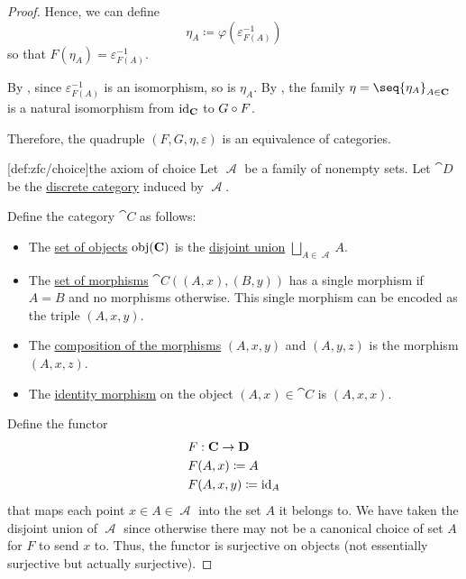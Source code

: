 \begin{proof}
  Hence, we can define
  \begin{equation*}
    \eta_A \coloneqq \varphi(\varepsilon_{F(A)}^{-1})
  \end{equation*}
  so that \( F(\eta_A) = \varepsilon_{F(A)}^{-1} \).

  By , since \( \varepsilon_{F(A)}^{-1} \) is an isomorphism, so is \( \eta_A \). By , the family \( \eta = \seq{ \eta_A }_{A \in \cat{C}} \) is a natural isomorphism from \( \operatorname{id}_{\operatorname{\mathbf{C}}} \) to \( G \bincirc F \).

  Therefore, the quadruple \( (F, G, \eta, \varepsilon) \) is an equivalence of categories.

  [def:zfc/choice]{the axiom of choice} Let \( \mscrA \) be a family of nonempty sets. Let \( \cat{D} \) be the \hyperref[def:discrete_category]{discrete category} induced by \( \mscrA \).

  Define the category \( \cat{C} \) as follows:
  \begin{itemize}
    \item The \hyperref[def:category/objects]{set of objects} \( \operatorname{obj}(\operatorname{\mathbf{C}}) \) is the \hyperref[def:disjoint_union]{disjoint union} \( \bigsqcup_{A \in \mscrA} A \).

    \item The \hyperref[def:category/morphisms]{set of morphisms} \( \cat{C}((A, x), (B, y)) \) has a single morphism if \( A = B \) and no morphisms otherwise. This single morphism can be encoded as the triple \( (A, x, y) \).

    \item The \hyperref[def:category/composition]{composition of the morphisms} \( (A, x, y) \) and \( (A, y, z) \) is the morphism \( (A, x, z) \).

    \item The \hyperref[def:category/identity]{identity morphism} on the object \( (A, x) \in \cat{C} \) is \( (A, x, x) \).
  \end{itemize}

  Define the functor
  \begin{equation*}
    \begin{aligned}
      &F: \operatorname{\mathbf{C}} \to \operatorname{\mathbf{D}} \\
      &F(A, x) \coloneqq A \\
      &F(A, x, y) \coloneqq \operatorname{id}_A
    \end{aligned}
  \end{equation*}
  that maps each point \( x \in A \in \mscrA \) into the set \( A \) it belongs to. We have taken the disjoint union of \( \mscrA \) since otherwise there may not be a canonical choice of set \( A \) for \( F \) to send \( x \) to. Thus, the functor is surjective on objects (not essentially surjective but actually surjective).


\end{proof}
